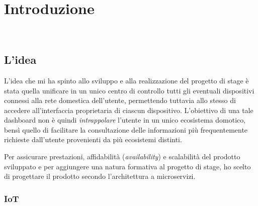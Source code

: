 
\chapter{Introduzione}
\label{cap:introduzione}

\\

% 
% 

\section{L'idea}

L'idea che mi ha spinto allo sviluppo e alla realizzazione del progetto di stage è stata quella unificare in un unico centro di controllo
tutti gli eventuali dispositivi connessi alla rete domestica dell'utente, permettendo 
tuttavia allo stesso di accedere all'interfaccia proprietaria di ciascun dispositivo.
L'obiettivo di una tale dashboard non è quindi \textit{intrappolare} l'utente in un unico ecosistema domotico, 
bensì quello di facilitare la consultazione delle informazioni più frequentemente richieste dall'utente provenienti da più ecosistemi distinti.

Per assicurare prestazioni, affidabilità (\textit{availability}) e scalabilità del prodotto sviluppato e per aggiungere una natura formativa al progetto di stage,
ho scelto di progettare il prodotto secondo l'architettura a microservizi.

\subsection{IoT}

